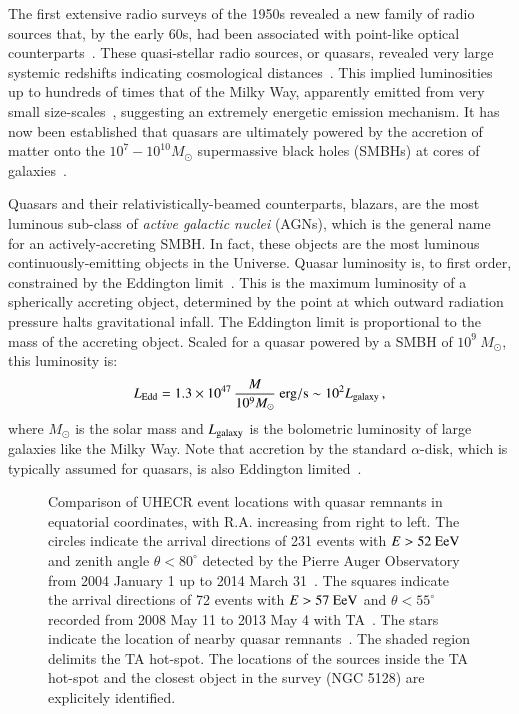 \documentclass[aps,prd,twocolumn,superscriptaddress,tightenlines,nofootinbib]{revtex4-1}
\newcommand{\postscript}[2]{\setlength{\epsfxsize}{#2\hsize}
   \centerline{\epsfbox{#1}}}
\begin{document}
The first extensive radio surveys of the 1950s revealed a new family
of radio sources that, by the early 60s, had been associated with
point-like optical counterparts~\cite{Hazard}. These quasi-stellar
radio sources, or quasars, 
revealed very large systemic redshifts indicating cosmological
distances~\cite{Schmidt}. This implied luminosities up to hundreds of
times that of the Milky Way, apparently emitted from very small
size-scales~\cite{Smith}, suggesting an extremely energetic emission
mechanism. It has now been established that quasars are ultimately
powered by the accretion of matter onto the $10^7-10^{10} M_\odot$
supermassive black holes (SMBHs) at cores of
galaxies~\cite{Zeldovich,Salpeter:1964kb,LyndenBell:1969yx,Antonucci:1993sg,Urry:1995mg}.

Quasars and their relativistically-beamed counterparts, blazars, are
the most luminous sub-class of {\it active galactic nuclei} (AGNs),
which is the general name for an actively-accreting SMBH. In fact,
these objects are the most luminous continuously-emitting objects in
the Universe. Quasar luminosity is, to first order, constrained by the
Eddington limit~\cite{Eddington}. This is the maximum luminosity of a spherically
accreting object, determined by the point at which outward radiation
pressure halts gravitational infall. The Eddington limit is
proportional to the mass of the accreting object. Scaled for a quasar
powered by a SMBH of $10^9~M_\odot$, this luminosity is:
\begin{equation}
L_{\rm Edd} = 1.3 \times 10^{47} \, \frac{M}{10^9 M_\odot}~{\rm erg/s} \sim 10^2 L_{\rm galaxy} \,,
\end{equation}
where $M_\odot$ is the solar mass and $L_{\rm galaxy}$ is the
bolometric luminosity of large galaxies like the Milky Way. Note that
accretion by the standard $\alpha$-disk, which is typically assumed
for quasars, is also Eddington limited~\cite{Shakura:1972te}.

\begin{figure}[b]
\postscript{skymap}{0.99}
\caption{Comparison of UHECR event locations with quasar remnants in
  equatorial coordinates, with R.A. increasing from right to left.  The
  circles indicate the arrival directions of 231 events with $E >
  52~{\rm EeV}$ and zenith angle $\theta < 80^\circ$ detected by the
  Pierre Auger Observatory from 2004 January 1 up to 2014 March
  31~\cite{PierreAuger:2014yba,Abreu:2010ab,Abraham:2007si,Abraham:2007bb}.
  The squares indicate the arrival directions of 72 events with
  $E>57~{\rm EeV}$ and $\theta < 55^\circ$ recorded from 2008 May 11
  to 2013 May 4 with TA~\cite{Abbasi:2014lda}. The stars indicate the
  location of nearby quasar
  remnants~\cite{Torres:2002bb,Isola:2003jk}.  The shaded region
  delimits the TA hot-spot. The locations of the sources inside the
  TA hot-spot and the closest object in the survey (NGC 5128) are
  explicitely identified.}
\label{fig:1}
\end{figure}
\end{document}
